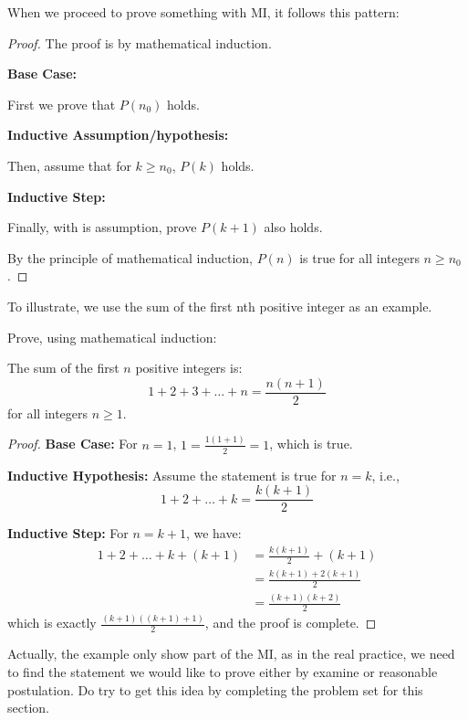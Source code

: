 \documentclass[
	12pt, %
	fleqn, %
	a4paper, %
]{LegrandOrangeBook}
\begin{document}
When we proceed to prove something with MI, it follows this pattern:
\begin{proof}
The proof is by mathematical induction.

\textbf{Base Case:} 

First we prove that \( P(n_0) \) holds.

\textbf{Inductive Assumption/hypothesis:}

Then, assume that for \( k \geq n_0 \), \( P(k) \) holds.

\textbf{Inductive Step:} 

Finally, with is assumption, prove \( P(k+1) \) also holds.

By the principle of mathematical induction, \( P(n) \) is true for all integers \( n \geq n_0 \).
\end{proof}

To illustrate, we use the sum of the first nth positive integer as an example.
\begin{example}
Prove, using mathematical induction:
\begin{theorem}
The sum of the first \( n \) positive integers is:
\[
1 + 2 + 3 + \ldots + n = \frac{n(n + 1)}{2}
\]
for all integers \( n \geq 1 \).
\end{theorem}
\end{example}

\begin{proof}
\textbf{Base Case:} For \( n = 1 \), \( 1 = \frac{1(1 + 1)}{2} = 1 \), which is true.

\textbf{Inductive Hypothesis:} Assume the statement is true for \( n = k \), i.e., 
\[
1 + 2 + \ldots + k = \frac{k(k + 1)}{2}
\]

\textbf{Inductive Step:} For \( n = k + 1 \), we have:
\begin{align*}
1 + 2 + \ldots + k + (k + 1) &= \frac{k(k + 1)}{2} + (k + 1) \\
&= \frac{k(k + 1) + 2(k + 1)}{2} \\
&= \frac{(k + 1)(k + 2)}{2}
\end{align*}
which is exactly \( \frac{(k + 1)((k + 1) + 1)}{2} \), and the proof is complete.
\end{proof}

\begin{remark}
    Actually, the example only show part of the MI, as in the real practice, we need to find the statement we would like to prove either by examine or reasonable postulation. Do try to get this idea by completing the problem set for this section.
\end{remark}
\end{document}

